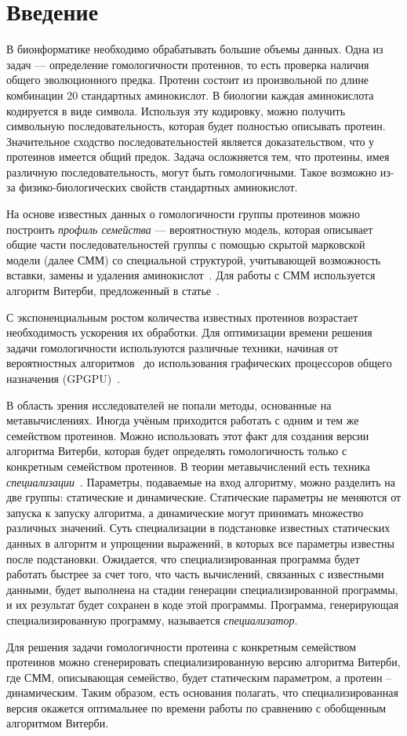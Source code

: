 \section*{Введение}

В бионформатике необходимо обрабатывать большие объемы данных.
Одна из задач --- определение гомологичности протеинов, то есть проверка наличия общего эволюционного предка.
Протеин состоит из произвольной по длине комбинации 20 стандартных аминокислот.
В биологии каждая аминокислота кодируется в виде символа.
Используя эту кодировку, можно получить символьную последовательность,
которая будет полностью описывать протеин.
Значительное сходство последовательностей является доказательством, что у
протеинов имеется общий предок.
Задача осложняется тем, что протеины, имея различную последовательность, могут
быть гомологичными.
Такое возможно из-за физико-биологических свойств стандартных аминокислот.

На основе известных данных о гомологичности группы протеинов можно построить
\emph{профиль семейства} --- вероятностную модель, которая описывает общие
части последовательностей группы с помощью  скрытой марковской модели (далее СММ) со специальной структурой, учитывающей возможность вставки, замены и
удаления аминокислот~\cite{HMM_Eddy}.
Для работы с СММ используется алгоритм Витерби, предложенный в статье~\cite{Viterbi}.

С экспоненциальным ростом количества известных протеинов возрастает
необходимость ускорения их обработки.
Для оптимизации времени решения задачи гомологичности используются различные 
техники, начиная от вероятностных алгоритмов~\cite{MSV_Eddy} до использования
графических процессоров общего назначения (GPGPU)~\cite{cudampf}.

В область зрения исследователей не попали методы, основанные на
метавычислениях.
Иногда учёным приходится работать с одним и тем же семейством
протеинов.
Можно использовать этот факт для создания версии алгоритма Витерби, 
которая будет определять гомологичность только с конкретным семейством протеинов.
В теории метавычислений есть техника \emph{специализации}~\cite{Jones_spec}.
Параметры, подаваемые на вход алгоритму, можно разделить на две группы:
статические и динамические.
Статические параметры не меняются от запуска к запуску алгоритма, а 
динамические могут принимать множество различных значений.
Суть специализации в подстановке известных статических данных в алгоритм и
упрощении выражений, в которых все параметры известны после подстановки.
Ожидается, что специализированная программа будет работать быстрее за счет
того, что часть вычислений, связанных с известными данными, будет выполнена на
стадии генерации специализированной программы, и их результат будет сохранен в
коде этой программы.
Программа, генерирующая специализированную программу, называется \emph{специализатор}.

Для решения задачи гомологичности протеина с конкретным семейством протеинов 
можно сгенерировать специализированную версию алгоритма Витерби,
где СММ, описывающая семейство, будет статическим параметром, 
а протеин -- динамическим.
Таким образом, есть основания полагать, что специализированная версия окажется 
оптимальнее по времени работы по сравнению с обобщенным алгоритмом Витерби.
